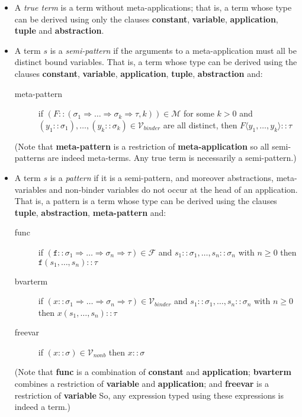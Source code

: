 \documentclass{lmcs}
\theoremstyle{theorem}\newtheorem{theorem}{Theorem}
\theoremstyle{theorem}\newtheorem{lemma}[theorem]{Lemma}
\theoremstyle{theorem}\newtheorem{corollary}[theorem]{Corollary}
\theoremstyle{definition}\newtheorem{definition}[theorem]{Definition}
\theoremstyle{definition}\newtheorem{example}[theorem]{Example}
\newcommand{\F}{\mathcal{F}}
\newcommand{\M}{\mathcal{M}}
\newcommand{\Vfree}{\mathcal{V}_{\mathit{nonb}}}
\newcommand{\Vbound}{\mathcal{V}_{\mathit{binder}}}
\newcommand{\atype}{\sigma}
\newcommand{\btype}{\tau}
\newcommand{\identifier}[1]{\mathtt{#1}}
\newcommand{\afun}{\identifier{f}}
\newcommand{\avar}{x}
\newcommand{\bvar}{y}
\newcommand{\ameta}{F}
\newcommand{\clause}[1]{\textbf{#1}}
\newcommand{\meta}[2]{#1\langle#2\rangle}
\newcommand{\arrtype}{\Rightarrow}
\begin{document}
\begin{itemize}
\item A \emph{true term} is a term without meta-applications; that is, a term
  whose type can be derived using only the clauses \clause{constant},
  \clause{variable}, \clause{application}, \clause{tuple} and
  \clause{abstraction}.

\item A term $s$ is a \emph{semi-pattern} if the arguments to a meta-application
  must all be distinct bound variables.  That is, a term whose type can be
  derived using the clauses \clause{constant}, \clause{variable},
  \clause{application}, \clause{tuple}, \clause{abstraction} and:
  \begin{description}
  \item[meta-pattern] if $(\ameta :: (\atype_1 \arrtype \dots \arrtype \atype_k
    \arrtype \btype,k)) \in \M$ for some $k > 0$ and $(\bvar_1 :: \atype_1),
    \dots,(\bvar_k :: \atype_k) \in \Vbound$ are all distinct, then
    $\meta{\ameta}{\bvar_1,\dots,\bvar_k} :: \btype$
  \end{description}
  (Note that \clause{meta-pattern} is a restriction of
  \clause{meta-application} so all semi-patterns are indeed meta-terms.  Any
  true term is necessarily a semi-pattern.)

\item A term $s$ is a \emph{pattern} if it is a semi-pattern, and moreover
  abstractions, meta-variables and non-binder variables do not occur at the head
  of an application.
  That is, a pattern is a term whose type can be derived using the clauses
  \clause{tuple}, \clause{abstraction}, \clause{meta-pattern} and:
  \begin{description}
  \item[func] if $(\afun :: \atype_1 \arrtype \dots \arrtype \atype_n
    \arrtype \btype) \in \F$ and $s_1 :: \atype_1,\dots,s_n :: \atype_n$ with
    $n \geq 0$ then $\afun(s_1,\dots,s_n) :: \btype$
  \item[bvarterm] if $(\avar :: \atype_1 \arrtype \dots \arrtype \atype_n
    \arrtype \btype) \in \Vbound$ and $s_1 :: \atype_1,\dots,s_n :: \atype_n$
    with $n \geq 0$ then $\avar(s_1,\dots,s_n) :: \btype$
  \item[freevar] if $(\avar :: \atype) \in \Vfree$ then $\avar :: \atype$
  \end{description}
  (Note that \clause{func} is a combination of \clause{constant} and
  \clause{application}; \clause{bvarterm} combines a restriction of
  \clause{variable} and \clause{application}; and \clause{freevar} is a
  restriction of \clause{variable}
  So, any expression typed using these expressions is indeed a term.)


\end{itemize}
\end{document}
